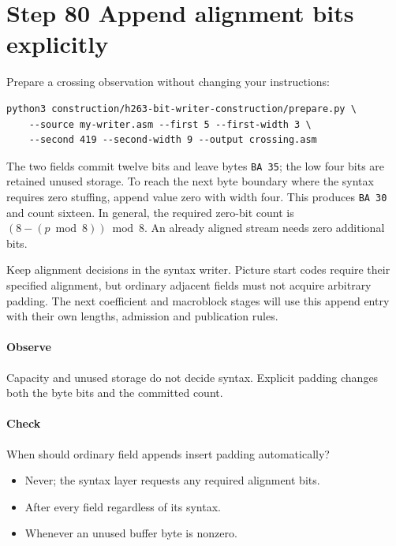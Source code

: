 \section{Step 80 Append alignment bits explicitly}\label{h263-writer-s10}
Prepare a crossing observation without changing your instructions:
\begin{verbatim}
python3 construction/h263-bit-writer-construction/prepare.py \
    --source my-writer.asm --first 5 --first-width 3 \
    --second 419 --second-width 9 --output crossing.asm
\end{verbatim}
The two fields commit twelve bits and leave bytes \texttt{BA 35}; the low four
bits are retained unused storage. To reach the next byte boundary where the
syntax requires zero stuffing, append value zero with width four. This produces
\texttt{BA 30} and count sixteen. In general, the required zero-bit count is
$(8-(p\bmod8))\bmod8$. An already aligned stream needs zero additional bits.

Keep alignment decisions in the syntax writer. Picture start codes require their
specified alignment, but ordinary adjacent fields must not acquire arbitrary
padding. The next coefficient and macroblock stages will use this append entry
with their own lengths, admission and publication rules.

\paragraph{Observe} Capacity and unused storage do not decide syntax. Explicit
padding changes both the byte bits and the committed count.
\Needspace{8\baselineskip}
\paragraph{Check} When should ordinary field appends insert padding automatically?
\begin{itemize}
  \item[A.] Never; the syntax layer requests any required alignment bits.
  \item[B.] After every field regardless of its syntax.
  \item[C.] Whenever an unused buffer byte is nonzero.
\end{itemize}
